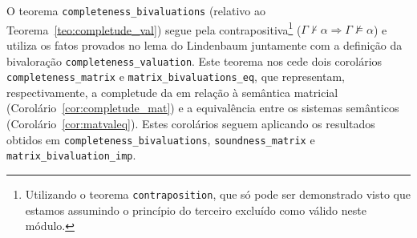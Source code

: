         O teorema \texttt{completeness\_bivaluations} (relativo ao Teorema~\ref{teo:completude_val}) segue pela contrapositiva\footnote{Utilizando o teorema \texttt{contraposition}, que só pode ser demonstrado visto que estamos assumindo o princípio do terceiro excluído como válido neste módulo.} ($\Gamma \nvdash \alpha \Longrightarrow \Gamma \nvDash \alpha$) e utiliza os fatos provados no lema do Lindenbaum juntamente com a definição da bivaloração \texttt{completeness\_valuation}. Este teorema nos cede dois corolários \texttt{completeness\_matrix} e \texttt{matrix\_bivaluations\_eq}, que representam, respectivamente, a completude da \lfium{} em relação à semântica matricial (Corolário~\ref{cor:completude_mat}) e a equivalência entre os sistemas semânticos (Corolário~\ref{cor:matvaleq}). Estes corolários seguem aplicando os resultados obtidos em \texttt{completeness\_bivaluations}, \texttt{soundness\_matrix} e \texttt{matrix\_bivaluation\_imp}.